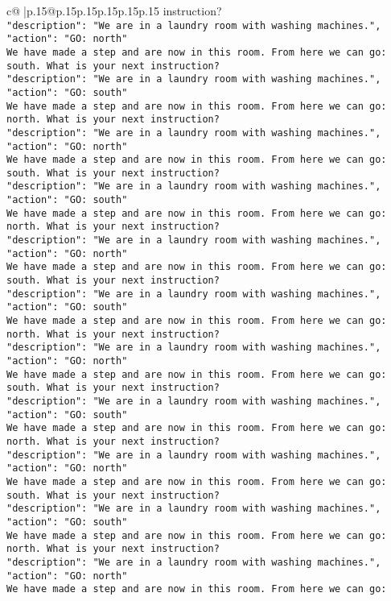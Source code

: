 \documentclass{article}
\begin{document}
{\begin{supertabular}{c@{$\;$}|p{.15\linewidth}@{}p{.15\linewidth}p{.15\linewidth}p{.15\linewidth}p{.15\linewidth}p{.15\linewidth}}
{{{instruction?\\ \tt {"description": "We are in a laundry room with washing machines.", "action": "GO: north"}\\ \tt We have made a step and are now in this room. From here we can go: south. What is your next instruction?\\ \tt {"description": "We are in a laundry room with washing machines.", "action": "GO: south"}\\ \tt We have made a step and are now in this room. From here we can go: north. What is your next instruction?\\ \tt {"description": "We are in a laundry room with washing machines.", "action": "GO: north"}\\ \tt We have made a step and are now in this room. From here we can go: south. What is your next instruction?\\ \tt {"description": "We are in a laundry room with washing machines.", "action": "GO: south"}\\ \tt We have made a step and are now in this room. From here we can go: north. What is your next instruction?\\ \tt {"description": "We are in a laundry room with washing machines.", "action": "GO: north"}\\ \tt We have made a step and are now in this room. From here we can go: south. What is your next instruction?\\ \tt {"description": "We are in a laundry room with washing machines.", "action": "GO: south"}\\ \tt We have made a step and are now in this room. From here we can go: north. What is your next instruction?\\ \tt {"description": "We are in a laundry room with washing machines.", "action": "GO: north"}\\ \tt We have made a step and are now in this room. From here we can go: south. What is your next instruction?\\ \tt {"description": "We are in a laundry room with washing machines.", "action": "GO: south"}\\ \tt We have made a step and are now in this room. From here we can go: north. What is your next instruction?\\ \tt {"description": "We are in a laundry room with washing machines.", "action": "GO: north"}\\ \tt We have made a step and are now in this room. From here we can go: south. What is your next instruction?\\ \tt {"description": "We are in a laundry room with washing machines.", "action": "GO: south"}\\ \tt We have made a step and are now in this room. From here we can go: north. What is your next instruction?\\ \tt {"description": "We are in a laundry room with washing machines.", "action": "GO: north"}\\ \tt We have made a step and are now in this room. From here we can go: }}}
\end{supertabular}}
\end{document}
